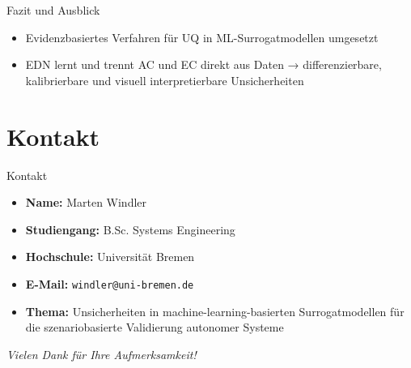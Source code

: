 \documentclass[10pt,a4paper,aspectratio=169]{beamer}
\begin{document}
\begin{frame}{Fazit und Ausblick}
	\begin{itemize}
		\item Evidenzbasiertes Verfahren für UQ in ML-Surrogatmodellen umgesetzt
		\item EDN lernt und trennt AC und EC direkt aus Daten → differenzierbare, kalibrierbare und visuell interpretierbare Unsicherheiten
	\end{itemize}
\end{frame}



\section[| 6: Kontakt]{Kontakt}

\begin{frame}{Kontakt}
	\begin{itemize}
		\item \textbf{Name:} Marten Windler
		\item \textbf{Studiengang:} B.Sc. Systems Engineering
		\item \textbf{Hochschule:} Universität Bremen
		\item \textbf{E-Mail:} \texttt{windler@uni-bremen.de}
		\item \textbf{Thema:} Unsicherheiten in machine-learning-basierten Surrogatmodellen für die szenariobasierte Validierung autonomer Systeme
	\end{itemize}
	\vspace{0.66em}
	\centering
	\textit{Vielen Dank für Ihre Aufmerksamkeit!}
\end{frame}
\end{document}
